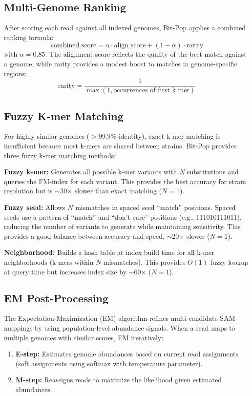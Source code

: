 \documentclass{article}
\begin{document}
\subsection{Multi-Genome Ranking}

After scoring each read against all indexed genomes, Bit-Pop applies a combined ranking formula:
\[
\text{combined\_score} = \alpha \cdot \text{align\_score} + (1 - \alpha) \cdot \text{rarity}
\]
with $\alpha = 0.85$. The alignment score reflects the quality of the best match against a genome, while rarity provides a modest boost to matches in genome-specific regions:
\[
\text{rarity} = \frac{1}{\max(1, \text{occurrences\_of\_first\_k\_mer})}
\]

\subsection{Fuzzy K-mer Matching}

For highly similar genomes ($>$99.9\% identity), exact k-mer matching is insufficient because most k-mers are shared between strains. Bit-Pop provides three fuzzy k-mer matching methods:

\textbf{Fuzzy k-mer:} Generates all possible k-mer variants with $N$ substitutions and queries the FM-index for each variant. This provides the best accuracy for strain resolution but is $\sim$30$\times$ slower than exact matching ($N=1$).

\textbf{Fuzzy seed:} Allows $N$ mismatches in spaced seed ``match'' positions. Spaced seeds use a pattern of ``match'' and ``don't care'' positions (e.g., 111010111011), reducing the number of variants to generate while maintaining sensitivity. This provides a good balance between accuracy and speed, $\sim$20$\times$ slower ($N=1$).

\textbf{Neighborhood:} Builds a hash table at index build time for all k-mer neighborhoods (k-mers within $N$ mismatches). This provides $O(1)$ fuzzy lookup at query time but increases index size by $\sim$60$\times$ ($N=1$).

\subsection{EM Post-Processing}

The Expectation-Maximization (EM) algorithm refines multi-candidate SAM mappings by using population-level abundance signals. When a read maps to multiple genomes with similar scores, EM iteratively:

\begin{enumerate}
    \item \textbf{E-step:} Estimates genome abundances based on current read assignments (soft assignments using softmax with temperature parameter).
    \item \textbf{M-step:} Reassigns reads to maximize the likelihood given estimated abundances.
\end{enumerate}
\end{document}
